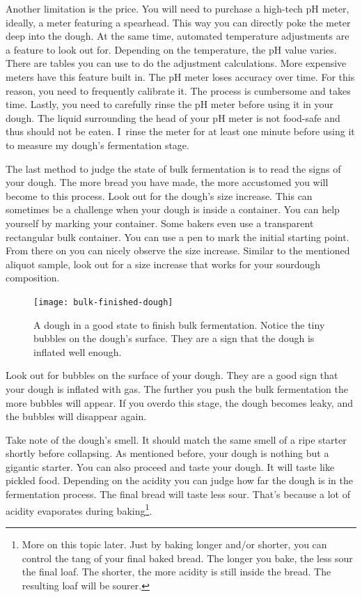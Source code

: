 Another limitation is the price. You will need to purchase
a high-tech pH meter, ideally, a meter featuring a spearhead.
This way you can directly poke the meter deep into the dough.
At the same time, automated temperature adjustments are a
feature to look out for. Depending on the temperature,
the pH value varies. There are tables you can use to
do the adjustment calculations. More expensive meters
have this feature built in. The pH meter loses accuracy
over time. For this reason, you need to frequently
calibrate it. The process is cumbersome and takes time.
Lastly, you need to carefully rinse the pH meter before
using it in your dough. The liquid surrounding the
head of your pH meter is not food-safe and thus should
not be eaten. I~rinse the meter for at least one minute
before using it to measure my dough's fermentation stage.

The last method to judge the state of bulk fermentation
is to read the signs of your dough. The more bread you have
made, the more accustomed you will become to this process.
Look out for the dough's size increase. This can sometimes
be a challenge when your dough is inside a container.
You can help yourself by marking your container. Some bakers
even use a transparent rectangular bulk container. You
can use a pen to mark the initial starting point. From there
on you can nicely observe the size increase. Similar to the
mentioned aliquot sample, look out for a size increase that works
for your sourdough composition.

\begin{figure}[!htb]
  \texttt{[image: bulk-finished-dough]}
  \caption[Dough at the end of bulk fermentation]{A dough in a good state to
      finish bulk fermentation. Notice the tiny bubbles on the dough's surface.
      They are a sign that the dough is inflated well enough.}
\end{figure}

Look out for bubbles on the surface of your dough. They
are a good sign that your dough is inflated with gas. The
further you push the bulk fermentation the more bubbles
will appear. If you overdo this stage, the dough becomes leaky, and
the bubbles will disappear again.

Take note of the dough's smell. It should match the same
smell of a ripe starter shortly before collapsing. As mentioned
before, your dough is nothing but a gigantic starter. You
can also proceed and taste your dough. It will taste like
pickled food. Depending on the acidity you can judge how
far the dough is in the fermentation process. The final bread
will taste less sour. That's because a lot of acidity evaporates
during baking\footnote{More on this topic later.
Just by baking longer and/or shorter, you can control
the tang of your final baked bread. The longer
you bake, the less sour the final loaf. The shorter,
the more acidity is still inside the bread. The resulting
loaf will be sourer.}.

